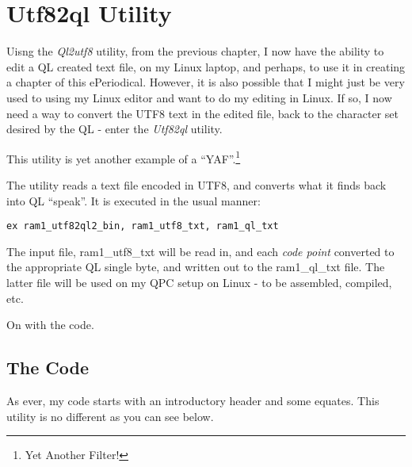 \chapter{Utf82ql Utility}

Uisng the \emph{Ql2utf8} utility, from the previous chapter, I now
have the ability to edit a QL created text file, on my Linux laptop,
and perhaps, to use it in creating a chapter of this ePeriodical.
However, it is also possible that I might just be very used to using
my Linux editor and want to do my editing in Linux. If so, I now need
a way to convert the UTF8 text in the edited file, back to the character
set desired by the QL - enter the \emph{Utf82ql} utility.

This utility is yet another example of a ``YAF''.\footnote{Yet Another Filter!}

The utility reads a text file encoded in UTF8, and converts what it
finds back into QL ``speak''. It is executed in the usual manner:

\begin{lstlisting}[numbers=none,caption={Executing utf82ql}]
ex ram1_utf82ql2_bin, ram1_utf8_txt, ram1_ql_txt
\end{lstlisting}

The input file, ram1\_utf8\_txt will be read in, and each \emph{code
point} converted to the appropriate QL single byte, and written out
to the ram1\_ql\_txt file. The latter file will be used on my QPC
setup on Linux - to be assembled, compiled, etc.

On with the code.

\section{The Code}

As ever, my code starts with an introductory header and some equates.
This utility is no different as you can see below.

